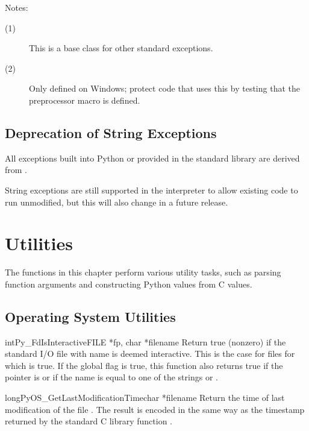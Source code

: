 \documentclass{manual}
\begin{document}
\noindent
Notes:
\begin{description}
\item[(1)]
  This is a base class for other standard exceptions.

\item[(2)]
  Only defined on Windows; protect code that uses this by testing that
  the preprocessor macro  is defined.
\end{description}


\section{Deprecation of String Exceptions}

All exceptions built into Python or provided in the standard library
are derived from .

String exceptions are still supported in the interpreter to allow
existing code to run unmodified, but this will also change in a future 
release.


\chapter{Utilities \label{utilities}}

The functions in this chapter perform various utility tasks, such as
parsing function arguments and constructing Python values from C
values.

\section{Operating System Utilities \label{os}}

\begin{cfuncdesc}{int}{Py_FdIsInteractive}{FILE *fp, char *filename}
Return true (nonzero) if the standard I/O file  with name
 is deemed interactive.  This is the case for files for
which  is true.  If the global flag
 is true, this function also returns true if
the  pointer is \NULL{} or if the name is equal to one of
the strings  or .
\end{cfuncdesc}

\begin{cfuncdesc}{long}{PyOS_GetLastModificationTime}{char *filename}
Return the time of last modification of the file .
The result is encoded in the same way as the timestamp returned by
the standard C library function .
\end{cfuncdesc}
\end{document}
